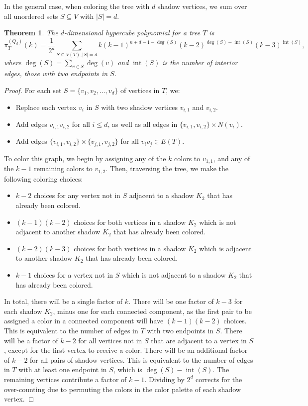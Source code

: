 \documentclass[12pt,reqno,dvipsnames]{amsart}
\newtheorem{theorem}{Theorem}[section]
\theoremstyle{definition}
\newcommand{\Int}{\operatorname{int}}
\begin{document}
In the general case, when coloring the tree with $d$ shadow vertices, we sum over all unordered sets $S \subseteq V$ with $|S| = d$.

\begin{theorem}\label{thm:hypercube-trees}
The $d$-dimensional hypercube polynomial for a tree $T$ is
$$
\pi_T^{(Q_d)}(k) =\frac{1}{2^d} \sum_{S \subseteq V(T), |S| = d} k (k - 1)^{n + d - 1 - \deg(S)} (k - 2)^{\deg(S) - \Int(S)} (k - 3)^{\Int(S)},
$$
where $\deg(S) = \sum_{v \in S} \deg(v)$ and $\Int(S)$ is the number of interior edges, those with two endpoints in $S$.
\end{theorem}

\begin{proof}
For each set $S=\{v_1,v_2,\dots,v_d\}$ of vertices in $T$, we:
\begin{itemize}
    \item Replace each vertex $v_i$ in $S$ with two shadow vertices $v_{i,1}$ and $v_{i,2}$.
    \item Add edges $v_{i,1}v_{i,2}$ for all $i\le d$, as well as all edges in $\{v_{i,1},v_{i,2}\}\times N(v_i)$.
    \item Add edges $\{v_{i,1},v_{i,2}\}\times \{v_{j,1},v_{j,2}\}$ for all $v_iv_j\in E(T)$.
\end{itemize}

To color this graph, we begin by assigning any of the $k$ colors to $v_{1,1}$, and any of the $k-1$ remaining colors to $v_{1,2}$. Then, traversing the tree, we make the following coloring choices:
\begin{itemize}
    \item $k-2$ choices for any vertex not in $S$ adjacent to a shadow $K_2$ that has already been colored.
    \item $(k-1)(k-2)$ choices for both vertices in a shadow $K_2$ which is not adjacent to another shadow $K_2$ that has already been colored.
    \item $(k-2)(k-3)$ choices for both vertices in a shadow $K_2$ which is adjacent to another shadow $K_2$ that has already been colored.
    \item $k-1$ choices for a vertex not in $S$ which is not adjacent to a shadow $K_2$ that has already been colored.
\end{itemize}
In total, there will be a single factor of $k$. There will be one factor of $k-3$ for each shadow $K_2$, minus one for each connected component, as the first pair to be assigned a color in a connected component will have $(k-1)(k-2)$ choices. This is equivalent to the number of edges in $T$ with two endpoints in $S$. There will be a factor of $k-2$ for all vertices not in $S$ that are adjacent to a vertex in $S$, except for the first vertex to receive a color. There will be an additional factor of $k-2$ for all pairs of shadow vertices. This is equivalent to the number of edges in $T$ with at least one endpoint in $S$, which is $\deg(S)-\Int(S)$. The remaining vertices contribute a factor of $k-1$. Dividing by $2^d$ corrects for the over-counting due to permuting the colors in the color palette of each shadow vertex.
\end{proof}
\end{document}
